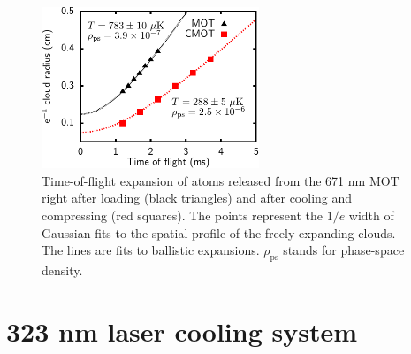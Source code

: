 \begin{figure} \hspace{0.16\textwidth}
\includegraphics[width=0.58\textwidth]{../masters-figures/323mot/tofexpansion-00/tofeps-SS.pdf}
\caption[671 nm cooled and compressed MOT]{\small  Time-of-flight expansion of
atoms released from the 671 nm MOT right after loading (black triangles) and after
cooling and compressing (red squares). The points represent the $1/e$ width of
Gaussian fits to the spatial profile of the freely expanding clouds.  The lines
are fits to ballistic expansions. $\rho_{\mathrm{ps}}$ stands for phase-space density. } \label{fig:cmotexp} \end{figure}



\section{323 nm laser cooling system}


